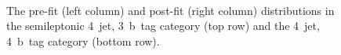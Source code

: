 \begin{figure}
\begin{centering}
 \\
\caption[The pre-fit and post-fit distributions in the semileptonic 4-jet categories]{The pre-fit (left column) and post-fit (right column) distributions in the semileptonic 4~jet, 3~b~tag category (top row) and the 4~jet, 4~b~tag category (bottom row).}
\label{fig:tth_postfit1}
\end{centering}
\end{figure}

